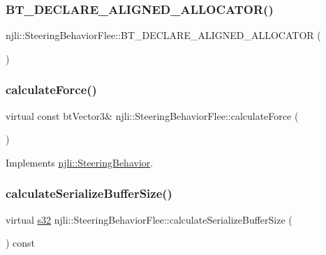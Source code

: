 \subsubsection{\texorpdfstring{B\+T\+\_\+\+D\+E\+C\+L\+A\+R\+E\+\_\+\+A\+L\+I\+G\+N\+E\+D\+\_\+\+A\+L\+L\+O\+C\+A\+T\+O\+R()}{BT\_DECLARE\_ALIGNED\_ALLOCATOR()}}
{\footnotesize\ttfamily njli\+::\+Steering\+Behavior\+Flee\+::\+B\+T\+\_\+\+D\+E\+C\+L\+A\+R\+E\+\_\+\+A\+L\+I\+G\+N\+E\+D\+\_\+\+A\+L\+L\+O\+C\+A\+T\+OR (\begin{DoxyParamCaption}{ }\end{DoxyParamCaption})\hspace{0.3cm}{\ttfamily [protected]}}

\mbox{\label{classnjli_1_1_steering_behavior_flee_a2f2eb808d8dd3d1792e7ff2916a02ac8}} 
\subsubsection{\texorpdfstring{calculate\+Force()}{calculateForce()}}
{\footnotesize\ttfamily virtual const bt\+Vector3\& njli\+::\+Steering\+Behavior\+Flee\+::calculate\+Force (\begin{DoxyParamCaption}{ }\end{DoxyParamCaption})\hspace{0.3cm}{\ttfamily [virtual]}}



Implements \mbox{\hyperlink{classnjli_1_1_steering_behavior_a9720953de1268f658636213946d76ed3}{njli\+::\+Steering\+Behavior}}.

\mbox{\label{classnjli_1_1_steering_behavior_flee_af688735b88770ca7e986b4f1607d7300}} 
\subsubsection{\texorpdfstring{calculate\+Serialize\+Buffer\+Size()}{calculateSerializeBufferSize()}}
{\footnotesize\ttfamily virtual \mbox{\hyperlink{_util_8h_aa62c75d314a0d1f37f79c4b73b2292e2}{s32}} njli\+::\+Steering\+Behavior\+Flee\+::calculate\+Serialize\+Buffer\+Size (\begin{DoxyParamCaption}{ }\end{DoxyParamCaption}) const\hspace{0.3cm}{\ttfamily [virtual]}}

